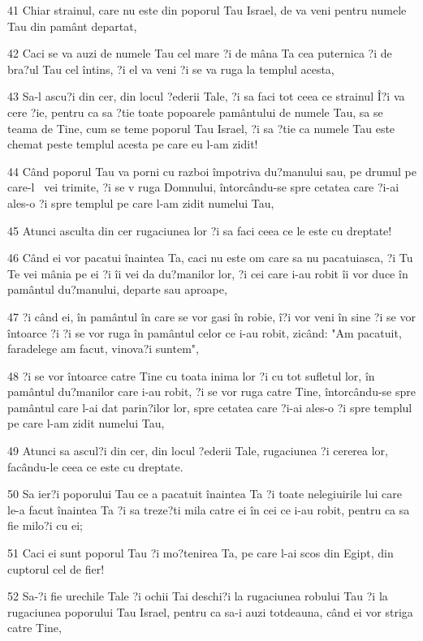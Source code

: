 \par 41 Chiar strainul, care nu este din poporul Tau Israel, de va veni pentru numele Tau din pamânt departat,
\par 42 Caci se va auzi de numele Tau cel mare ?i de mâna Ta cea puternica ?i de bra?ul Tau cel întins, ?i el va veni ?i se va ruga la templul acesta,
\par 43 Sa-l ascu?i din cer, din locul ?ederii Tale, ?i sa faci tot ceea ce strainul Î?i va cere ?ie, pentru ca sa ?tie toate popoarele pamântului de numele Tau, sa se teama de Tine, cum se teme poporul Tau Israel, ?i sa ?tie ca numele Tau este chemat peste templul acesta pe care eu l-am zidit!
\par 44 Când poporul Tau va porni cu razboi împotriva du?manului sau, pe drumul pe care-l  vei trimite, ?i se v ruga Domnului, întorcându-se spre cetatea care ?i-ai ales-o ?i spre templul pe care l-am zidit numelui Tau,
\par 45 Atunci asculta din cer rugaciunea lor ?i sa faci ceea ce le este cu dreptate!
\par 46 Când ei vor pacatui înaintea Ta, caci nu este om care sa nu pacatuiasca, ?i Tu Te vei mânia pe ei ?i îi vei da du?manilor lor, ?i cei care i-au robit îi vor duce în pamântul du?manului, departe sau aproape,
\par 47 ?i când ei, în pamântul în care se vor gasi în robie, î?i vor veni în sine ?i se vor întoarce ?i ?i se vor ruga în pamântul celor ce i-au robit, zicând: "Am pacatuit, faradelege am facut, vinova?i suntem",
\par 48 ?i se vor întoarce catre Tine cu toata inima lor ?i cu tot sufletul lor, în pamântul du?manilor care i-au robit, ?i se vor ruga catre Tine, întorcându-se spre pamântul care l-ai dat parin?ilor lor, spre cetatea care ?i-ai ales-o ?i spre templul pe care l-am zidit numelui Tau,
\par 49 Atunci sa ascul?i din cer, din locul ?ederii Tale, rugaciunea ?i cererea lor, facându-le ceea ce este cu dreptate.
\par 50 Sa ier?i poporului Tau ce a pacatuit înaintea Ta ?i toate nelegiuirile lui care le-a facut înaintea Ta ?i sa treze?ti mila catre ei în cei ce i-au robit, pentru ca sa fie milo?i cu ei;
\par 51 Caci ei sunt poporul Tau ?i mo?tenirea Ta, pe care l-ai scos din Egipt, din cuptorul cel de fier!
\par 52 Sa-?i fie urechile Tale ?i ochii Tai deschi?i la rugaciunea robului Tau ?i la rugaciunea poporului Tau Israel, pentru ca sa-i auzi totdeauna, când ei vor striga catre Tine,
